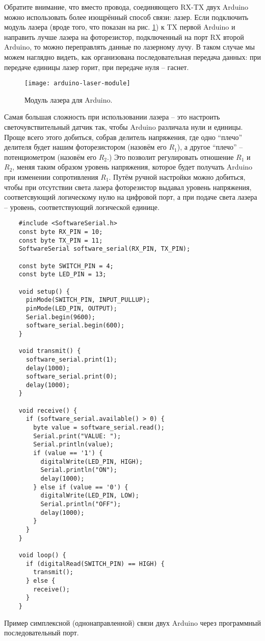 \documentclass[../sparc.tex]{subfiles}
\begin{document}
Обратите внимание, что вместо провода, соединяющего RX-TX двух Arduino можно
использовать более изощрённый способ связи: лазер.  Если подключить модуль
лазера (вроде того, что показан на рис. \ref{fig:arduino-laser-module}) к TX
первой Arduino и направить лучше лазера на фоторезистор, подключенный на порт RX
второй Arduino, то можно переправлять данные по лазерному лучу.  В таком случае
мы можем наглядно видеть, как организована последовательная передача данных: при
передаче единицы лазер горит, при передаче нуля -- гаснет.

\begin{figure}[ht]
  \centering
  \texttt{[image: arduino-laser-module]}
  \caption{Модуль лазера для Arduino.}
  \label{fig:arduino-laser-module}
\end{figure}


Самая большая сложность при использовании лазера -- это настроить
светочувствительный датчик так, чтобы Arduino различала нули и единицы.  Проще
всего этого добиться, собрав делитель напряжения, где одно ``плечо'' делителя
будет нашим фоторезистором (назовём его $R_1$), а другое ``плечо'' --
потенциометром (назовём его $R_2$.)  Это позволит регулировать отношение $R_1$ и
$R_2$, меняя таким образом уровень напряжения, которое будет получать Arduino
при изменении сопротивления $R_1$.  Путём ручной настройки можно добиться, чтобы
при отсутствии света лазера фоторезистор выдавал уровень напряжения,
соответсвующий логическому нулю на цифровой порт, а при подаче света лазера --
уровень, соответствующий логической единице.

\begin{listing}[H]
  \begin{verbatim}
    #include <SoftwareSerial.h>
    const byte RX_PIN = 10;
    const byte TX_PIN = 11;
    SoftwareSerial software_serial(RX_PIN, TX_PIN);

    const byte SWITCH_PIN = 4;
    const byte LED_PIN = 13;

    void setup() {
      pinMode(SWITCH_PIN, INPUT_PULLUP);
      pinMode(LED_PIN, OUTPUT);
      Serial.begin(9600);
      software_serial.begin(600);
    }

    void transmit() {
      software_serial.print(1);
      delay(1000);
      software_serial.print(0);
      delay(1000);
    }

    void receive() {
      if (software_serial.available() > 0) {
        byte value = software_serial.read();
        Serial.print("VALUE: ");
        Serial.println(value);
        if (value == '1') {
          digitalWrite(LED_PIN, HIGH);
          Serial.println("ON");
          delay(1000);
        } else if (value == '0') {
          digitalWrite(LED_PIN, LOW);
          Serial.println("OFF");
          delay(1000);
        }
      }
    }

    void loop() {
      if (digitalRead(SWITCH_PIN) == HIGH) {
        transmit();
      } else {
        receive();
      }
    }
  \end{verbatim}
  \label{listing:communication-serial-two-arduino-example}
  \caption{Пример симплексной (однонаправленной) связи двух Arduino через
    программный последовательный порт.}
\end{listing}
\end{document}
